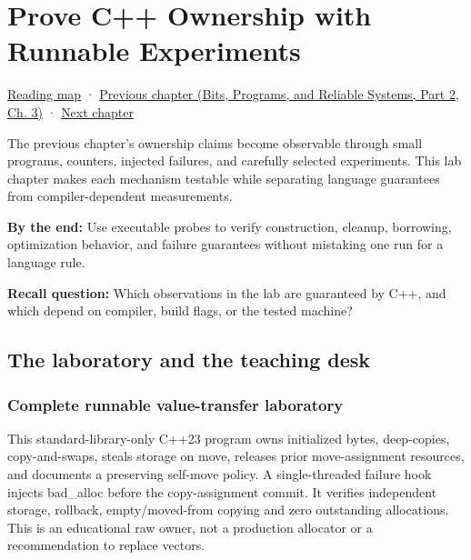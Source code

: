 \chapter{Prove C++ Ownership with Runnable Experiments}\label{01-foundations-i-ch004-prove-c-ownership-with-runnable-experiments}\hypertarget{01-foundations-i-ch004}{}\label{stagechapter:01-foundations-i-ch004}

\hypertarget{01-foundations-i-ch004-prove-c-ownership-with-runnable-experiments}{}

\hyperref[volume-reading-map]{Reading map} · \href{../01-Bits-Programs-and-Reliable-Systems-P02/main.pdf\#nameddest=01-foundations-i-ch003-records-as-resource-transactions}{Previous chapter (Bits, Programs, and Reliable Systems, Part 2, Ch. 3)} · \hyperref[01-foundations-i-ch005-generic-asset-pipelines-without-hidden-contracts]{Next chapter}

The previous chapter's ownership claims become observable through small programs, counters, injected failures, and carefully selected experiments. This lab chapter makes each mechanism testable while separating language guarantees from compiler-dependent measurements.

\textbf{By the end:} Use executable probes to verify construction, cleanup, borrowing, optimization behavior, and failure guarantees without mistaking one run for a language rule.

\textbf{Recall question:} Which observations in the lab are guaranteed by C++, and which depend on compiler, build flags, or the tested machine?

\section{The laboratory and the teaching desk}\label{01-foundations-i-ch004-the-laboratory-and-the-teaching-desk}

\hypertarget{01-foundations-i-ch004-the-laboratory-and-the-teaching-desk}{}

\subsection{Complete runnable value-transfer laboratory}\label{01-foundations-i-ch004-complete-runnable-value-transfer-laboratory}

\hypertarget{01-foundations-i-ch004-complete-runnable-value-transfer-laboratory}{}

This standard-library-only C++23 program owns initialized bytes, deep-copies, copy-and-swaps, steals storage on move, releases prior move-assignment resources, and documents a preserving self-move policy. A single-threaded failure hook injects bad\_alloc before the copy-assignment commit. It verifies independent storage, rollback, empty/moved-from copying and zero outstanding allocations. This is an educational raw owner, not a production allocator or a recommendation to replace vectors.

